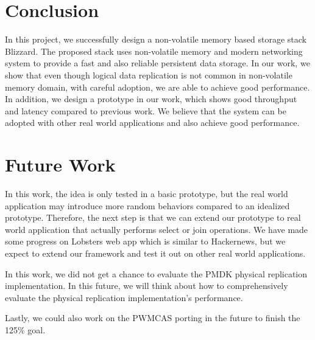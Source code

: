 \section{Conclusion}
In this project, we successfully design a non-volatile memory based storage stack Blizzard. The proposed stack uses non-volatile memory and modern networking system to provide a fast and also reliable persistent data storage. In our work, we show that even though logical data replication is not common in non-volatile memory domain, with careful adoption, we are able to achieve good performance. In addition, we design a prototype in our work, which shows good throughput and latency compared to previous work. We believe that the system can be adopted with other real world applications and also achieve good performance. 

\section{Future Work}
In this work, the idea is only tested in a basic prototype, but the real world application may introduce more random behaviors compared to an idealized prototype. Therefore, the next step is that we can extend our prototype to real world application that actually performs select or join operations. We have made some progress on Lobsters web app which is similar to Hackernews, but we expect to extend our framework and test it out on other real world applications. 

In this work, we did not get a chance to evaluate the PMDK physical replication implementation. In this future, we will think about how to comprehensively evaluate the physical replication implementation's performance. 

Lastly, we could also work on the PWMCAS porting in the future to finish the 125$\%$ goal.
